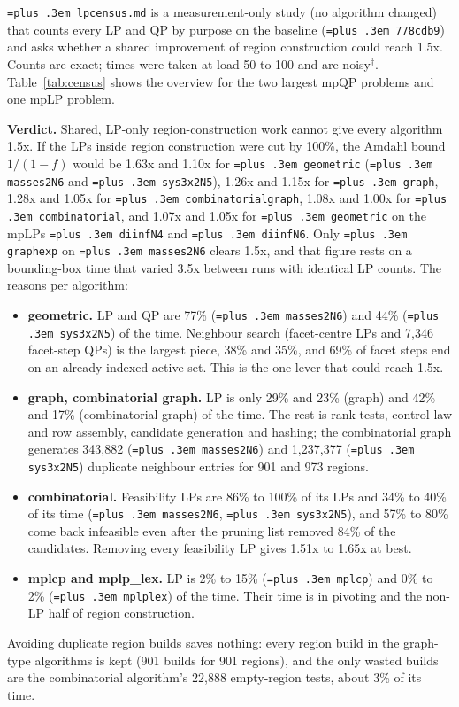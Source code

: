 \documentclass[10pt,a4paper]{article}
\newcommand{\busy}{$^\dagger$}
\newcommand{\sizenote}{Size is $n_\theta/n_x/m$: parameters, variables, constraints (Table~\ref{tab:sizes}).}
\newcommand{\code}[1]{{\let\_\bu\texttt{\spaceskip=\fontdimen2\font plus .3em #1}}}
\newcommand{\bu}{\textunderscore\hspace{0pt}}
\begin{document}
\code{lp\_census.md} is a measurement-only study (no algorithm changed) that counts every LP and QP by purpose on the baseline
(\code{778cdb9}) and asks whether a shared improvement of region construction could reach 1.5x. Counts are exact; times were taken at load 50 to 100 and are noisy\busy{}.
Table~\ref{tab:census} shows the overview for the two largest mpQP problems and one mpLP problem.

\begin{table}[!htbp]
\centering\small\setlength{\tabcolsep}{4pt}
\caption{LP census (\code{lp\_census.md}). LPs are counted per solve; LP time share is of total solve time\busy{}. \sizenote}
\label{tab:census}

\end{table}

\textbf{Verdict.} Shared, LP-only region-construction work cannot give every algorithm 1.5x. If the LPs inside region construction were cut by 100\%,
the Amdahl bound $1/(1-f)$ would be 1.63x and 1.10x for \code{geometric} (\code{masses2\_N6} and \code{sys3x2\_N5}), 1.26x and 1.15x for \code{graph}, 1.28x and 1.05x for
\code{combinatorial\_graph}, 1.08x and 1.00x for \code{combinatorial}, and 1.07x and 1.05x for \code{geometric} on the mpLPs \code{diinf\_N4} and \code{diinf\_N6}. Only \code{graph\_exp} on \code{masses2\_N6} clears 1.5x,
and that figure rests on a bounding-box time that varied 3.5x between runs with identical LP counts. The reasons per algorithm:
\begin{itemize}
  \item \textbf{geometric.} LP and QP are 77\% (\code{masses2\_N6}) and 44\% (\code{sys3x2\_N5}) of the time. Neighbour search (facet-centre LPs and
    7,346 facet-step QPs) is the largest piece, 38\% and 35\%, and 69\% of facet steps end on an already indexed active set. This is the one lever that could reach 1.5x.
  \item \textbf{graph, combinatorial graph.} LP is only 29\% and 23\% (graph) and 42\% and 17\% (combinatorial graph) of the time. The rest is rank tests, control-law
    and row assembly, candidate generation and hashing; the combinatorial graph generates 343,882 (\code{masses2\_N6}) and 1,237,377 (\code{sys3x2\_N5}) duplicate neighbour entries for 901 and 973 regions.
  \item \textbf{combinatorial.} Feasibility LPs are 86\% to 100\% of its LPs and 34\% to 40\% of its time (\code{masses2\_N6}, \code{sys3x2\_N5}), and 57\% to 80\% come back infeasible even after the pruning list removed 84\% of the candidates.
    Removing every feasibility LP gives 1.51x to 1.65x at best.
  \item \textbf{mplcp and mplp\_lex.} LP is 2\% to 15\% (\code{mplcp}) and 0\% to 2\% (\code{mplp\_lex}) of the time. Their time is in pivoting and the non-LP half of region construction.
\end{itemize}
Avoiding duplicate region builds saves nothing: every region build in the graph-type algorithms is kept (901 builds for 901 regions), and the only wasted builds are the combinatorial
algorithm's 22,888 empty-region tests, about 3\% of its time.
\end{document}

